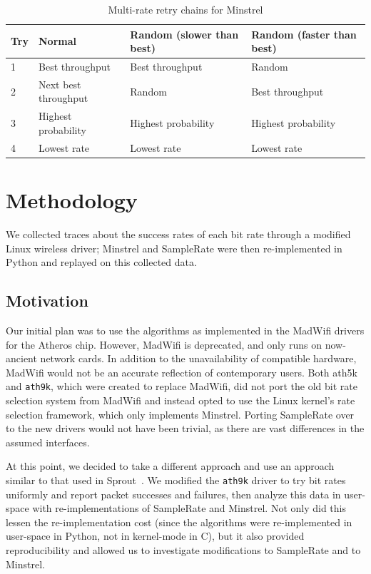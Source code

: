 \documentclass[twocolumn,10pt]{article}
\begin{document}
\begin{table}[htb]
  \centering
    \begin{tabular}[htb]{l|l|l|l}
    \textbf{Try} & \textbf{Normal} &
    \textbf{Random (slower than best)} &
    \textbf{Random (faster than best)} \\ \hline
    1 & Best throughput      & Best throughput     & Random              \\
    2 & Next best throughput & Random              & Best throughput     \\
    3 & Highest probability  & Highest probability & Highest probability \\
    4 & Lowest rate          & Lowest rate         & Lowest rate         \\
    \end{tabular}
    \caption{Multi-rate retry chains for Minstrel}
\label{table:mrr}
\end{table}

\section{Methodology} \label{sec:methodology}

We collected traces about the success rates of each bit rate through a
modified Linux wireless driver; Minstrel and SampleRate were then
re-implemented in Python and replayed on this collected data.

\subsection{Motivation}

Our initial plan was to use the algorithms as implemented in the
MadWifi drivers for the Atheros chip.  However, MadWifi is deprecated,
and only runs on now-ancient network cards.  In addition to the
unavailability of compatible hardware, MadWifi would not be an
accurate reflection of contemporary users.  Both ath5k and
\texttt{ath9k}, which were created to replace MadWifi, did not port
the old bit rate selection system from MadWifi and instead opted to
use the Linux kernel's rate selection framework, which only implements
Minstrel.  Porting SampleRate over to the new drivers would not have
been trivial, as there are vast differences in the assumed interfaces.

At this point, we decided to take a different approach and use an
approach similar to that used in Sprout~\cite{sprout}.  We modified
the \texttt{ath9k} driver to try bit rates uniformly and report packet
successes and failures, then analyze this data in user-space with
re-implementations of SampleRate and Minstrel.  Not only did this
lessen the re-implementation cost (since the algorithms were
re-implemented in user-space in Python, not in kernel-mode in C), but
it also provided reproducibility and allowed us to investigate
modifications to SampleRate and to Minstrel.
\end{document}
